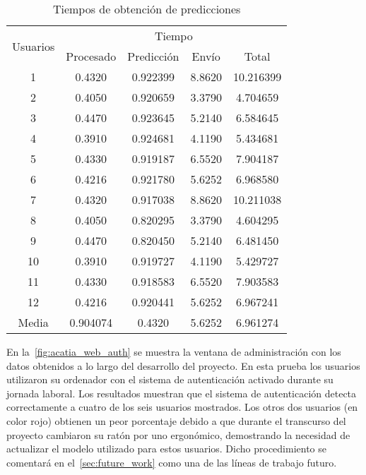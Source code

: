 \begin{table}[htbp!]
    \centering
    \begin{tabular}{c | c c c | c}
        \toprule
        \multirow{2}{*}{Usuarios} & \multicolumn{4}{c}{Tiempo}                              \\ \cline{2-5}
                                  & Procesado                  & Predicción & Envío & Total \\
        \midrule\midrule
        1    &      0.4320 & 0.922399 & 8.8620 &           10.216399 \\
        2    &      0.4050 & 0.920659 & 3.3790 &            4.704659 \\
        3    &      0.4470 & 0.923645 & 5.2140 &            6.584645 \\
        4    &      0.3910 & 0.924681 & 4.1190 &            5.434681 \\
        5    &      0.4330 & 0.919187 & 6.5520 &            7.904187 \\
        6    &      0.4216 & 0.921780 & 5.6252 &            6.968580 \\
        7    &      0.4320 & 0.917038 & 8.8620 &           10.211038 \\
        8    &      0.4050 & 0.820295 & 3.3790 &            4.604295 \\
        9    &      0.4470 & 0.820450 & 5.2140 &            6.481450 \\
        10    &      0.3910 & 0.919727 & 4.1190 &            5.429727 \\
        11    &      0.4330 & 0.918583 & 6.5520 &            7.903583 \\
        12    &      0.4216 & 0.920441 & 5.6252 &            6.967241 \\
        \midrule\midrule
        Media &      0.904074 &        0.4320 &         5.6252 &            6.961274 \\


        \bottomrule
    \end{tabular}
    \caption{Tiempos de obtención de predicciones}
    \label{tab:prediction_time}
\end{table}

En la~\cref{fig:acatia_web_auth} se muestra la ventana de administración con los datos obtenidos a lo largo del desarrollo del proyecto. En esta prueba los usuarios utilizaron su ordenador con el sistema de autenticación activado durante su jornada laboral. Los resultados muestran que el sistema de autenticación detecta correctamente a cuatro de los seis usuarios mostrados. Los otros dos usuarios (en color rojo) obtienen un peor porcentaje debido a que durante el transcurso del proyecto cambiaron su ratón por uno ergonómico, demostrando la necesidad de actualizar el modelo utilizado para estos usuarios. Dicho procedimiento se comentará en el~\cref{sec:future_work} como una de las líneas de trabajo futuro.



